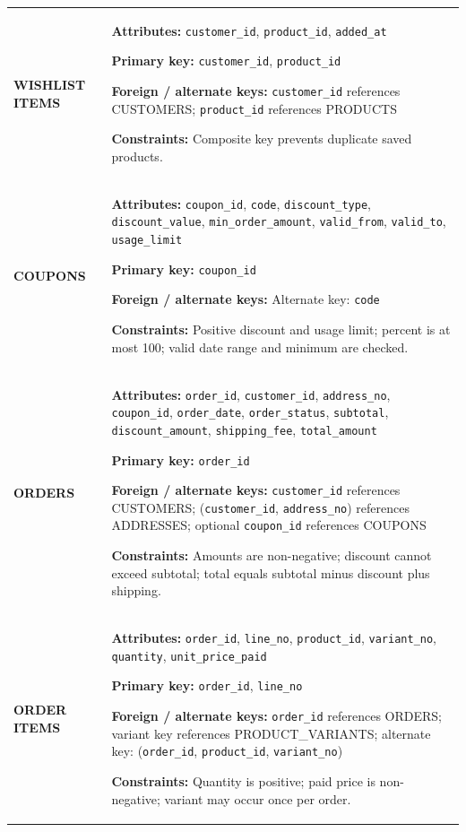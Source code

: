 \documentclass[11pt,a4paper,oneside]{report}
\begin{document}
\begin{longtable}{@{}P{39mm}P{117mm}@{}}
\textbf{WISHLIST ITEMS} & \textbf{Attributes:} \texttt{customer\_id}, \texttt{product\_id}, \texttt{added\_at}\par\textbf{Primary key:} \texttt{customer\_id}, \texttt{product\_id}\par\textbf{Foreign / alternate keys:} \texttt{customer\_id} references CUSTOMERS; \texttt{product\_id} references PRODUCTS\par\textbf{Constraints:} Composite key prevents duplicate saved products. \\
\textbf{COUPONS} & \textbf{Attributes:} \texttt{coupon\_id}, \texttt{code}, \texttt{discount\_type}, \texttt{discount\_value}, \texttt{min\_order\_amount}, \texttt{valid\_from}, \texttt{valid\_to}, \texttt{usage\_limit}\par\textbf{Primary key:} \texttt{coupon\_id}\par\textbf{Foreign / alternate keys:} Alternate key: \texttt{code}\par\textbf{Constraints:} Positive discount and usage limit; percent is at most 100; valid date range and minimum are checked. \\
\textbf{ORDERS} & \textbf{Attributes:} \texttt{order\_id}, \texttt{customer\_id}, \texttt{address\_no}, \texttt{coupon\_id}, \texttt{order\_date}, \texttt{order\_status}, \texttt{subtotal}, \texttt{discount\_amount}, \texttt{shipping\_fee}, \texttt{total\_amount}\par\textbf{Primary key:} \texttt{order\_id}\par\textbf{Foreign / alternate keys:} \texttt{customer\_id} references CUSTOMERS; (\texttt{customer\_id}, \texttt{address\_no}) references ADDRESSES; optional \texttt{coupon\_id} references COUPONS\par\textbf{Constraints:} Amounts are non-negative; discount cannot exceed subtotal; total equals subtotal minus discount plus shipping. \\
\textbf{ORDER ITEMS} & \textbf{Attributes:} \texttt{order\_id}, \texttt{line\_no}, \texttt{product\_id}, \texttt{variant\_no}, \texttt{quantity}, \texttt{unit\_price\_paid}\par\textbf{Primary key:} \texttt{order\_id}, \texttt{line\_no}\par\textbf{Foreign / alternate keys:} \texttt{order\_id} references ORDERS; variant key references PRODUCT\_VARIANTS; alternate key: (\texttt{order\_id}, \texttt{product\_id}, \texttt{variant\_no})\par\textbf{Constraints:} Quantity is positive; paid price is non-negative; variant may occur once per order. \\

\end{longtable}
\end{document}
